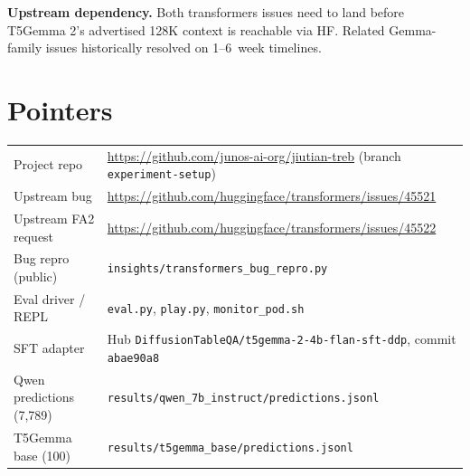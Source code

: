 \documentclass[11pt]{article}
\begin{document}
\textbf{Upstream dependency.} Both transformers issues need to land before T5Gemma 2's advertised 128K context is reachable via HF. Related Gemma-family issues historically resolved on 1--6~week timelines.

\section*{Pointers}
\small
\begin{tabular}{ll}
Project repo            & \url{https://github.com/junos-ai-org/jiutian-treb} (branch \texttt{experiment-setup}) \\
Upstream bug            & \url{https://github.com/huggingface/transformers/issues/45521} \\
Upstream FA2 request    & \url{https://github.com/huggingface/transformers/issues/45522} \\
Bug repro (public)      & \texttt{insights/transformers\_bug\_repro.py} \\
Eval driver / REPL      & \texttt{eval.py}, \texttt{play.py}, \texttt{monitor\_pod.sh} \\
SFT adapter             & Hub \texttt{DiffusionTableQA/t5gemma-2-4b-flan-sft-ddp}, commit \texttt{abae90a8} \\
Qwen predictions (7{,}789) & \texttt{results/qwen\_7b\_instruct/predictions.jsonl} \\
T5Gemma base (100)      & \texttt{results/t5gemma\_base/predictions.jsonl} \\
\end{tabular}
\end{document}
